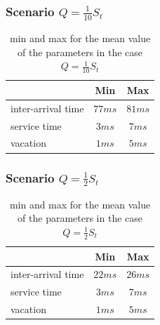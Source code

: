 \documentclass{article}
\begin{document}
        \newpage
        
        \subsubsection{Scenario $Q = \frac{1}{10} S_t$}
             \begin{table}[htbp!]
                \centering 
                \begin{tabular}{|l|c|c|}
                    \hline
                    \ & Min & Max \\
                    \hline
                    inter-arrival time & $77ms$ & $81ms$ \\
                    \hline
                    service time & $3ms$ & $7ms$ \\
                    \hline
                    vacation & $1ms$ & $5ms$ \\
                    \hline
                \end{tabular}
                \caption{min and max for the mean value of the parameters in the case $Q = \frac{1}{10} S_t$} 
            \end{table}
        
         \subsubsection{Scenario $Q = \frac{1}{2} S_t$}
             \begin{table}[htbp!]
                \centering 
                \begin{tabular}{|l|c|c|}
                    \hline
                    \ & Min & Max \\
                    \hline
                    inter-arrival time & $22ms$ & $26ms$ \\
                    \hline
                    service time & $3ms$ & $7ms$ \\
                    \hline
                    vacation & $1ms$ & $5ms$ \\
                    \hline
                \end{tabular}
                \caption{min and max for the mean value of the parameters in the case $Q = \frac{1}{2} S_t$} 
            \end{table}
            
\end{document}
